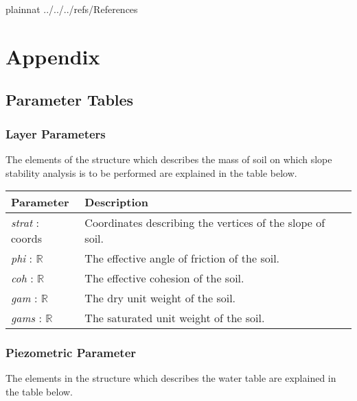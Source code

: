 \documentclass[12pt, titlepage]{article}
\begin{document}
\newpage

 {plainnat}
 {../../../refs/References}

\newpage

\section{Appendix}

\subsection{Parameter Tables} \label{sec:ParamTables}

\subsubsection{Layer Parameters} \label{Tbl:LayerParam}
\noindent
The elements of the structure which describes the mass of soil on 
which slope stability analysis is to be performed are explained in the table 
below.

\begin{center}
\begin{longtable}{ p{}
    p{}}\hline

  \textbf{Parameter} & \textbf{Description}\\ \hline

  \textit{strat} : coords
  & Coordinates describing the vertices of the slope of soil.\\

  \textit{phi} : $\mathbb{R}$ & The
  effective angle of friction of the soil.\\

  \textit{coh} : $\mathbb{R}$ & The
  effective cohesion of the soil.\\

  \textit{gam} : $\mathbb{R}$ & The dry
  unit weight of the soil.\\

  \textit{gams} : $\mathbb{R}$ & The
  saturated unit weight of the soil. \\ \hline
\end{longtable}
\end{center}

\subsubsection{Piezometric Parameter} \label{Tbl:PiezParam}
\noindent
The elements in the structure which describes the water table are 
explained in the table below.
\end{document}

